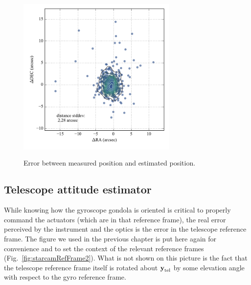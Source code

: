 \begin{figure}[!h]
\begin{center}
\includegraphics[width=0.7\textwidth]{Figures/measured_vs_estimated.pdf}
\label{fig:MeasuredVsEstimated}
\caption[Error between measured position and estimated position]{Error between measured position and estimated position.}
\end{center}
\end{figure}




\subsection{Telescope attitude estimator}

While knowing how the gyroscope gondola is oriented is critical to properly command the actuators (which are in that reference frame), the real error perceived by the instrument and the optics is the error in the telescope reference frame. The figure we used in the previous chapter is put here again for convenience and to set the context of the relevant reference frames (Fig.~\ref{fig:starcamRefFrame2}). What is not shown on this picture is the fact that the telescope reference frame itself is rotated about $\textrm{\textbf{y}}_{\textrm{tel}}$ by some elevation angle with respect to the gyro reference frame. 

